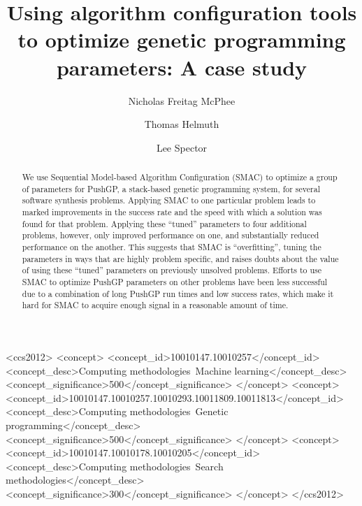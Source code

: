\documentclass[sigconf]{acmart}
\begin{document}
\title[Using algorithm configuration tools to optimize genetic programming parameters]{Using algorithm configuration tools to optimize genetic programming parameters: A case study}

\author{Nicholas Freitag McPhee}

\author{Thomas Helmuth}

\author{Lee Spector}

\begin{abstract}
	We use 
	Sequential Model-based Algorithm Configuration (SMAC) to optimize
	a group of parameters for PushGP, a stack-based genetic programming
	system, for
	several software synthesis problems. Applying
	SMAC to one particular problem leads
	to marked improvements in the success rate and the speed with which
	a solution was found for that problem. Applying these ``tuned'' 
	parameters to four
	additional problems, however, only improved performance on one, and
	substantially reduced performance on the another. This suggests that SMAC 
	is ``overfitting'', tuning the parameters in ways that are 
	highly problem specific, and raises doubts about the value of
	using these ``tuned'' parameters on  previously unsolved problems.
	Efforts to use SMAC to optimize PushGP parameters on other problems
	have been less successful due to a combination of long PushGP run times
	and low success rates, which make it hard for SMAC to acquire enough
	signal in a reasonable amount of time.
\end{abstract}

%
%
\begin{CCSXML}
	<ccs2012>
	<concept>
	<concept_id>10010147.10010257</concept_id>
	<concept_desc>Computing methodologies~Machine learning</concept_desc>
	<concept_significance>500</concept_significance>
	</concept>
	<concept>
	<concept_id>10010147.10010257.10010293.10011809.10011813</concept_id>
	<concept_desc>Computing methodologies~Genetic programming</concept_desc>
	<concept_significance>500</concept_significance>
	</concept>
	<concept>
	<concept_id>10010147.10010178.10010205</concept_id>
	<concept_desc>Computing methodologies~Search methodologies</concept_desc>
	<concept_significance>300</concept_significance>
	</concept>
	</ccs2012>
\end{CCSXML}
\end{document}
